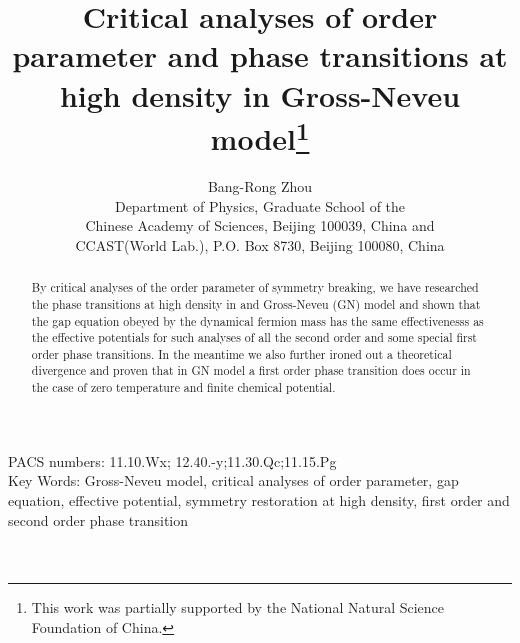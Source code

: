 \documentclass[a4paper,eqsecnum]{revtex4}
\begin{document}
\title{Critical analyses of order parameter and phase transitions at high density 
in Gross-Neveu model\footnote{ This work was partially supported by the National Natural Science Foundation of China.}
\\
}
\author{Bang-Rong Zhou \\
Department of Physics, Graduate School of the \\
Chinese Academy of Sciences, Beijing 100039, China and \\
CCAST(World Lab.), P.O. Box 8730, Beijing 100080, China }
\begin{abstract}
By critical analyses of the order parameter of symmetry breaking, we have researched 
the phase transitions at high density in \coordHE{} and \coordHE{} Gross-Neveu (GN) model and 
shown that the gap equation obeyed by the dynamical fermion mass has the same 
effectivenesss as the effective potentials for such analyses of all the second order 
and some special first order phase transitions. In the meantime we also further ironed 
out a theoretical divergence and proven that in \coordHE{} GN model a first order phase 
transition does occur in the case of zero temperature and finite chemical potential.
\end{abstract}
\maketitle
PACS numbers: 11.10.Wx; 12.40.-y;11.30.Qc;11.15.Pg \\
Key Words: Gross-Neveu model, critical analyses of order parameter,
gap equation, effective potential, symmetry restoration at high density,
 first order and second order phase transition \\ \\ \\
\end{document}
